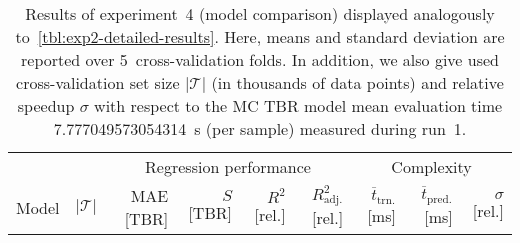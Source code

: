 \begin{table}[!hbt]
	\centering
	\setlength\tabcolsep{4pt}
	{\scriptsize
		\begin{tabular}{lrrrrrrrr}
		\toprule
		{} & {} & \multicolumn{4}{c}{Regression performance} &
		\multicolumn{3}{c}{Complexity}\\
		\cmidrule(lr){3-6}
		\cmidrule(lr){7-9}
		Model & $|\mathcal{T}|$ & MAE [TBR] & $S$ [TBR] & $R^2$ [rel.] & $R^2_{\text{adj.}}$ [rel.]
						& $\overline{t}_{\text{trn.}}$ [\si{\milli\second}] &
		$\overline{t}_{\text{pred.}}$ [\si{\milli\second}] & $\sigma$ [rel.]\\
		\midrule
		
		\bottomrule
		\end{tabular}
	}
	\caption{Results of experiment~4 (model comparison) displayed analogously
		to~\cref{tbl:exp2-detailed-results}. Here, means and standard deviation
		are reported over 5~cross-validation folds. In addition, we also give
		used cross-validation set size $|\mathcal{T}|$ (in thousands of data
		points) and relative speedup $\sigma$ with respect to the
		MC TBR model mean evaluation time \SI{7.777049573054314}{\second} (per
		sample) measured during run~1.}
	\label{tbl:exp4-detailed-results}
\end{table}

